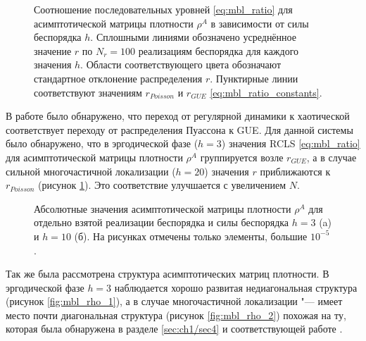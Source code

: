 \begin{figure}[h]
	\caption[Соотношение последовательных уровней для асимптотической матрицы плотности в зависимости от силы беспорядка в системе]{
		Соотношение последовательных уровней \cref{eq:mbl_ratio} для асимптотической матрицы плотности \(\rho^A\) в зависимости от силы беспорядка \(h\). Сплошными линиями обозначено усреднённое значение \(r\) по \(N_r=100\) реализациям беспорядка для каждого значения \(h\). Области соответствующего цвета обозначают стандартное отклонение распределения \(r\). Пунктирные линии соответствуют значениям \(r_{Poisson}\) и \(r_{GUE}\) \cref{eq:mbl_ratio_constants}.
	}
	\label{fig:mbl_ratio}
\end{figure}

В работе \cite{Prosen2013} было обнаружено, что переход от регулярной динамики к хаотической соответствует переходу от распределения Пуассона к GUE.
Для данной системы было обнаружено, что в эргодической фазе (\(h=3\)) значения RCLS \cref{eq:mbl_ratio} для асимптотической матрицы плотности \(\rho^A\) группируется возле \(r_{GUE}\), а в случае сильной многочастичной локализации (\(h=20\)) значения \(r\) приближаются к \(r_{Poisson}\) (рисунок \cref{fig:mbl_ratio}). Это соответствие улучшается с увеличением \(N\).

\begin{figure}[h]
	\legend{}
	\caption[Структура асимптотической матрицы плотности для эргодической фазы и случая многочастичной локализации]
	{
		Абсолютные значения асимптотической матрицы плотности \(\rho^A\) для отдельно взятой реализации беспорядка и силы беспорядка \(h=3\) (a) и \(h=10\) (б). На рисунках отмечены только элементы, большие \(10^{-5}\).
	}
	\label{fig:mbl_rho}
\end{figure}

Так же была рассмотрена структура асимптотических матриц плотности.
В эргодической фазе \(h=3\) наблюдается хорошо развитая недиагональная структура (рисунок \cref{fig:mbl_rho_1}), а в случае многочастичной локализации "--- имеет место почти диагональная структура (рисунок \cref{fig:mbl_rho_2}) похожая на ту, которая была обнаружена в разделе \cref{sec:ch1/sec4} и соответствующей работе \cite{Yusipov2017}.

